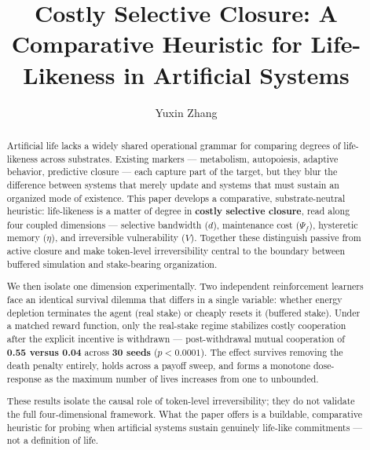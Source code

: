 \documentclass[Afour,sageh,times,doublespace]{sagej}
\begin{document}

\title{Costly Selective Closure: A Comparative Heuristic for Life-Likeness in Artificial Systems}

\author{Yuxin Zhang}




\begin{abstract}
Artificial life lacks a widely shared operational grammar for comparing degrees of life-likeness across substrates. Existing markers --- metabolism, autopoiesis, adaptive behavior, predictive closure --- each capture part of the target, but they blur the difference between systems that merely update and systems that must sustain an organized mode of existence. This paper develops a comparative, substrate-neutral heuristic: life-likeness is a matter of degree in \textbf{costly selective closure}, read along four coupled dimensions --- selective bandwidth (\(d\)), maintenance cost (\(\Psi_f\)), hysteretic memory (\(\eta\)), and irreversible vulnerability (\(V\)). Together these distinguish passive from active closure and make token-level irreversibility central to the boundary between buffered simulation and stake-bearing organization.

We then isolate one dimension experimentally. Two independent reinforcement learners face an identical survival dilemma that differs in a single variable: whether energy depletion terminates the agent (real stake) or cheaply resets it (buffered stake). Under a matched reward function, only the real-stake regime stabilizes costly cooperation after the explicit incentive is withdrawn --- post-withdrawal mutual cooperation of \textbf{0.55 versus 0.04} across \textbf{30 seeds} (\(p < 0.0001\)). The effect survives removing the death penalty entirely, holds across a payoff sweep, and forms a monotone dose-response as the maximum number of lives increases from one to unbounded.

These results isolate the causal role of token-level irreversibility; they do not validate the full four-dimensional framework. What the paper offers is a buildable, comparative heuristic for probing when artificial systems sustain genuinely life-like commitments --- not a definition of life.
\end{abstract}

\end{document}
